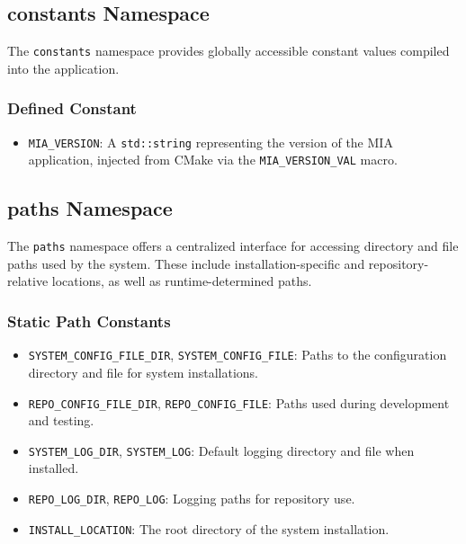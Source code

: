 \subsection{constants Namespace}

The \texttt{constants} namespace provides globally accessible constant values compiled into the application.

\subsubsection*{Defined Constant}
\begin{itemize}
	\item \texttt{MIA\_VERSION}: A \texttt{std::string} representing the version of the MIA application, injected from CMake via the \texttt{MIA\_VERSION\_VAL} macro.
\end{itemize}

\subsection{paths Namespace}

The \texttt{paths} namespace offers a centralized interface for accessing directory and file paths used by the system. These include installation-specific and repository-relative locations, as well as runtime-determined paths.

\subsubsection*{Static Path Constants}
\begin{itemize}
	\item \texttt{SYSTEM\_CONFIG\_FILE\_DIR}, \texttt{SYSTEM\_CONFIG\_FILE}: Paths to the configuration directory and file for system installations.
	\item \texttt{REPO\_CONFIG\_FILE\_DIR}, \texttt{REPO\_CONFIG\_FILE}: Paths used during development and testing.
	\item \texttt{SYSTEM\_LOG\_DIR}, \texttt{SYSTEM\_LOG}: Default logging directory and file when installed.
	\item \texttt{REPO\_LOG\_DIR}, \texttt{REPO\_LOG}: Logging paths for repository use.
	\item \texttt{INSTALL\_LOCATION}: The root directory of the system installation.
\end{itemize}

